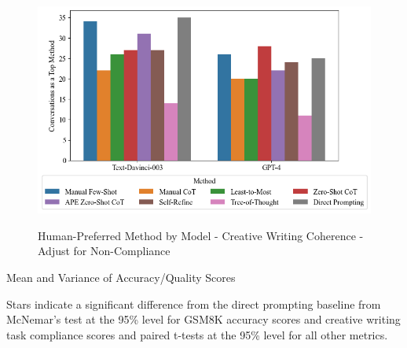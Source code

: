 \documentclass[11pt]{article}
\begin{document}
\begin{centering}

  \onecolumn

  


  \begin{figure}[h]
    \caption{Human-Preferred Method by Model - Creative Writing Coherence - Adjust for Non-Compliance}
    \centering
    \includegraphics[width=\textwidth]{../Output/cw_preference_plot_coherence_1_incoherent_10_very_coherent_compliance_adjusted.png}
    \label{fig:cw_preference_plot_ca}
  \end{figure}

  \begin{table}
    \caption{Mean and Variance of Accuracy/Quality Scores}
    \centering
    \tiny
      
    \label{tab:accuracy_quality}
    \newline \newline \footnotesize Stars indicate a significant difference from the direct prompting baseline from McNemar's test at the 95\% level for GSM8K accuracy scores and creative writing task compliance scores and paired t-tests at the 95\% level for all other metrics.
  \end{table}


\end{centering}
\end{document}
